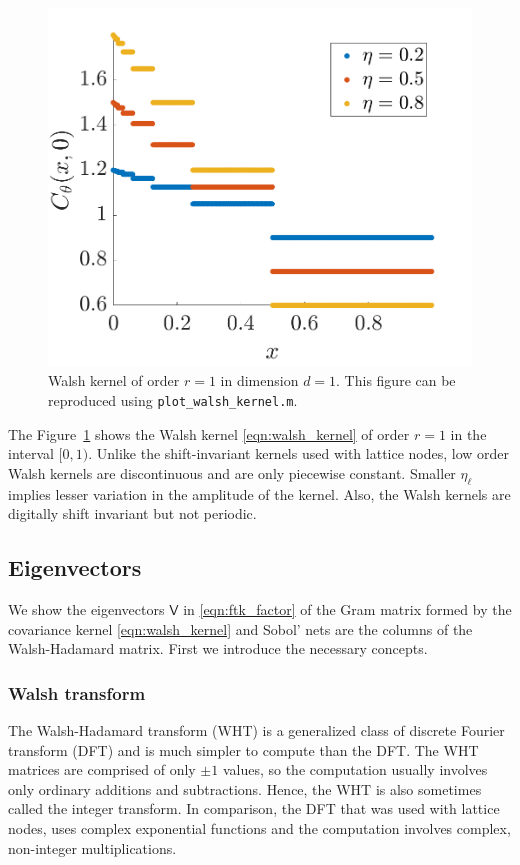 \documentclass{svjour3}                     %
\newcommand{\mV}{\mathsf{V}}
\newcommand{\code}[1]{\texttt{#1}}
\newcommand\figref{Figure~\ref}
\newcommand{\JRNote}[1]{{\textcolor{green}{JR: #1}}}
\begin{document}
\begin{figure}
	\centering
	\includegraphics[width=0.9\linewidth]{"figures/walsh_kernel dim_1"}
	\caption[Walsh kernel]{Walsh kernel of order $r=1$ in dimension $d=1$. This figure can be reproduced using \code{plot\_walsh\_kernel.m}. %
	}
	\label{fig:walshkernel-dim1}
\end{figure}

The \figref{fig:walshkernel-dim1} shows the Walsh kernel \eqref{eqn:walsh_kernel} of order $r=1$ in the interval $[0,1)$. Unlike the shift-invariant kernels used with lattice nodes, low order Walsh kernels are discontinuous and are only piecewise constant. Smaller $\eta_\ell$ implies lesser variation in the amplitude of the kernel. Also, the Walsh kernels are digitally shift invariant but not periodic.

\subsection{Eigenvectors}

We show the eigenvectors $\mV$ in \eqref{eqn:ftk_factor} of the Gram matrix formed by the covariance kernel \eqref{eqn:walsh_kernel} and Sobol' nets are the columns of the Walsh-Hadamard matrix. First we introduce the necessary concepts.

\subsubsection{Walsh transform}
The Walsh-Hadamard transform (WHT) is a generalized class of discrete Fourier transform (DFT) and is much simpler to compute than the DFT. The WHT matrices are comprised of only $\pm 1$ values, so the computation usually involves only ordinary additions and subtractions. Hence, the WHT is also sometimes called the integer transform. In comparison, the DFT that was used with lattice nodes,  uses complex exponential functions and the computation involves complex, non-integer multiplications. 
\end{document}
